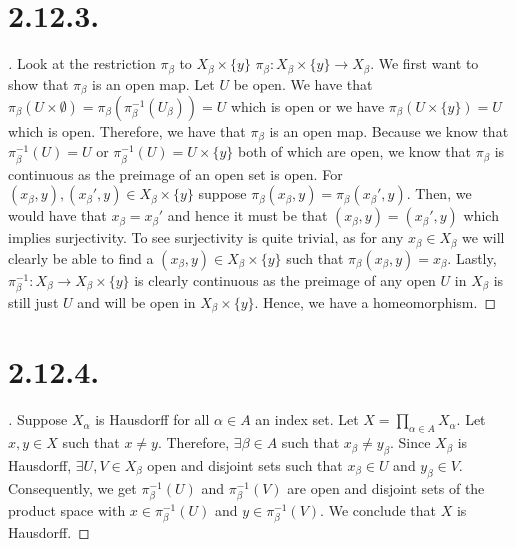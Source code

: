 \documentclass{article}
\begin{document}
\section*{2.12.3.}
\begin{proof}[\unskip\nopunct]
    Look at the restriction $\pi_{\beta}$ to $X_{\beta} \times \{y\}$ $\pi_{\beta}:X_{\beta} \times \{y\} \to X_{\beta}$. We first want to show that $\pi_{\beta}$ is an open map. Let $U$ be open. We have that $\pi_{\beta} (U \times \emptyset) = \pi_{\beta}(\pi_{\beta}^{-1}(U_{\beta})) = U$ which is open
    or we have $\pi_{\beta} (U \times \{y\}) = U$ which is open. Therefore, we have that $\pi_{\beta}$ is an open map.
    Because we know that $\pi_{\beta}^{-1}(U) = U$ or $\pi_{\beta}^{-1}(U) = U \times \{y\}$ both of which are open, we 
    know that $\pi_{\beta}$ is continuous as the preimage of an open 
    set is open. For $(x_{\beta}, y), (x_{\beta}', y) \in X_{\beta} \times \{y\}$ suppose $\pi_{\beta}(x_{\beta}, y) = \pi_{\beta}(x_{\beta}', y)$. Then, we would have that $x_{\beta} = x_{\beta}'$
    and hence it must be that $(x_{\beta}, y) = (x_{\beta}', y)$ which implies surjectivity. To see surjectivity is quite trivial, as for any 
    $x_{\beta} \in X_{\beta}$ we will clearly be able to 
    find a $(x_{\beta}, y) \in X_{\beta} \times \{y\}$ such that $\pi_{\beta}(x_{\beta}, y) = x_{\beta}$. 
    Lastly, $\pi_{\beta}^{-1}:X_{\beta} \to X_{\beta} \times \{y\}$ is clearly
    continuous as the preimage of any open $U$ in $X_{\beta}$ is still just $U$ and will be open in $X_{\beta} \times \{y\}$.
    Hence, we have a homeomorphism.  

    
\end{proof}

\section*{2.12.4.}
\begin{proof}[\unskip\nopunct]
    Suppose $X_{\alpha}$ is Hausdorff for all $\alpha \in A$ an index set. 
    Let $X = \prod\limits_{\alpha \in A} X_{\alpha}$. 
    Let $x, y \in X$ such that $x \neq y$. Therefore, $\exists \beta \in A$ such that $x_{\beta} \neq y_{\beta}$. Since $X_{\beta}$ is Hausdorff, $\exists U, V \in X_{\beta}$ open and disjoint sets such that $x_{\beta} \in U$ and $y_{\beta} \in V$. Consequently, we get $\pi_{\beta}^{-1}(U)$ and $\pi_{\beta}^{-1}(V)$ are open and disjoint sets of the 
    product space with $x \in \pi_{\beta}^{-1}(U)$ and $y \in \pi_{\beta}^{-1}(V)$. We conclude that $X$ is Hausdorff. 


\end{proof}
\end{document}
